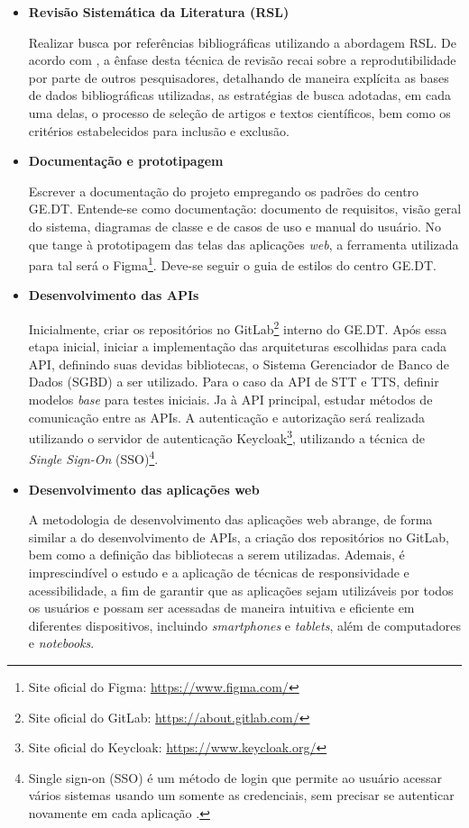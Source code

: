 \documentclass[
	12pt,				%
	a4paper,			%
	english,			%
	brazil,				%
	]{article}
\begin{document}
\begin{itemize}
	\item \textbf{Revisão Sistemática da Literatura (RSL)}
	
		Realizar busca por referências bibliográficas utilizando a abordagem RSL. De acordo com , a ênfase desta técnica de revisão recai sobre a reprodutibilidade por parte de outros pesquisadores, detalhando de maneira explícita as bases de dados bibliográficas utilizadas, as estratégias de busca adotadas, em cada uma delas, o processo de seleção de artigos e textos científicos, bem como os critérios estabelecidos para inclusão e exclusão.
		
	\item \textbf{Documentação e prototipagem}
	
		Escrever a documentação do projeto empregando os padrões do centro GE.DT. Entende-se como documentação: documento de requisitos, visão geral do sistema, diagramas de classe e de casos de uso e manual do usuário. No que tange à prototipagem das telas das aplicações \textit{web}, a ferramenta utilizada para tal será o Figma\footnote{Site oficial do Figma: \url{https://www.figma.com/}}. Deve-se seguir o guia de estilos do centro GE.DT.
		
	
	\item \textbf{Desenvolvimento das APIs}
	
		Inicialmente, criar os repositórios no GitLab\footnote{Site oficial do GitLab: \url{https://about.gitlab.com/}} interno do GE.DT. Após essa etapa inicial, iniciar a implementação das arquiteturas escolhidas para cada API, definindo suas devidas bibliotecas, o Sistema Gerenciador de Banco de Dados (SGBD) a ser utilizado. Para o caso da API de STT e TTS, definir modelos \textit{base} para testes iniciais. Ja à API principal, estudar métodos de comunicação entre as APIs. A autenticação e autorização será realizada utilizando o servidor de autenticação Keycloak\footnote{Site oficial do Keycloak: \url{https://www.keycloak.org/}}, utilizando a técnica de \textit{Single Sign-On} (SSO)\footnote{Single sign-on (SSO) é um método de login que permite ao usuário acessar vários sistemas usando um somente as credenciais, sem precisar se autenticar novamente em cada aplicação \cite{scapicchio2024}.}. 
	
	\item \textbf{Desenvolvimento das aplicações web}
	
		A metodologia de desenvolvimento das aplicações web abrange, de forma similar a do desenvolvimento de APIs, a criação dos repositórios no GitLab, bem como a definição das bibliotecas a serem utilizadas. Ademais, é imprescindível o estudo e a aplicação de técnicas de responsividade e acessibilidade, a fim de garantir que as aplicações sejam utilizáveis por todos os usuários e possam ser acessadas de maneira intuitiva e eficiente em diferentes dispositivos, incluindo \textit{smartphones} e \textit{tablets}, além de computadores e \textit{notebooks}.
	
\end{itemize}
\end{document}
